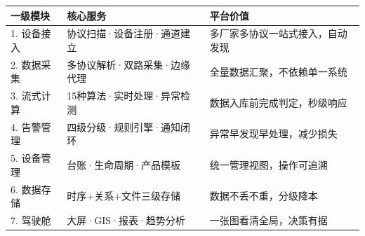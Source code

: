 \documentclass[11pt,a4paper]{ctexart}
\begin{document}
\begin{table}[H]\centering
\begin{tabular}{p{2.5cm}p{3.5cm}p{7cm}}
\toprule
\textbf{一级模块} & \textbf{核心服务} & \textbf{平台价值} \\
\midrule
1. 设备接入 & 协议扫描·设备注册·通道建立 & 多厂家多协议一站式接入，自动发现\\[2pt]
2. 数据采集 & 多协议解析·双路采集·边缘代理 & 全量数据汇聚，不依赖单一系统\\[2pt]
3. 流式计算 & 15种算法·实时处理·异常检测 & 数据入库前完成判定，秒级响应\\[2pt]
4. 告警管理 & 四级分级·规则引擎·通知闭环 & 异常早发现早处理，减少损失\\[2pt]
5. 设备管理 & 台账·生命周期·产品模板 & 统一管理视图，操作可追溯\\[2pt]
6. 数据存储 & 时序+关系+文件三级存储 & 数据不丢不重，分级降本\\[2pt]
7. 驾驶舱 & 大屏·GIS·报表·趋势分析 & 一张图看清全局，决策有据\\
\bottomrule
\end{tabular}
\end{table}
\end{document}
